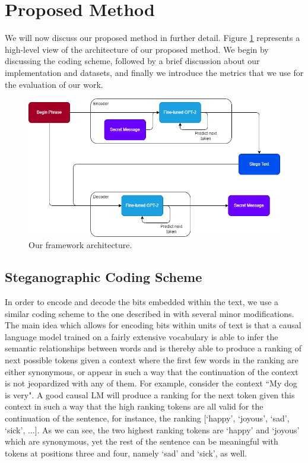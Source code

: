 \documentclass[journal,onecolumn]{IEEEtran}
\begin{document}
\section{Proposed Method}
We will now discuss our proposed method in further detail. Figure \ref{fig:arch} represents a high-level view of the architecture of our proposed method.
We begin by discussing the coding scheme, followed by a brief discussion about our implementation and datasets,
and finally we introduce the metrics that we use for the evaluation of our work.
\begin{figure}[b]
	\centering
	\includegraphics[width=0.8\linewidth]{figures/arch.png}
	\caption{Our framework architecture.}
	\label{fig:arch}
\end{figure}
\subsection{Steganographic Coding Scheme}
In order to encode and decode the bits embedded within the text, we use a similar coding scheme to the one described in \cite{yang2020gan} with several minor modifications.
The main idea which allows for encoding bits within units of text is that a causal language model trained on a fairly extensive vocabulary is able to infer the semantic relationships
between words and is thereby able to produce a ranking of next possible tokens given a context where the first few words in the ranking are either synonymous, or appear
in such a way that the continuation of the context is not jeopardized with any of them. For example, consider the context ``My dog is very". A good causal LM will produce a ranking for
the next token given this context in such a way that the high ranking tokens are all valid for the continuation of the sentence, for instance, the ranking [`happy', `joyous', `sad', `sick', ...].
As we can see, the two highest ranking tokens are `happy' and `joyous' which are synonymous, yet the rest of the sentence can be meaningful with tokens at positions
three and four, namely `sad' and `sick', as well.
\end{document}
